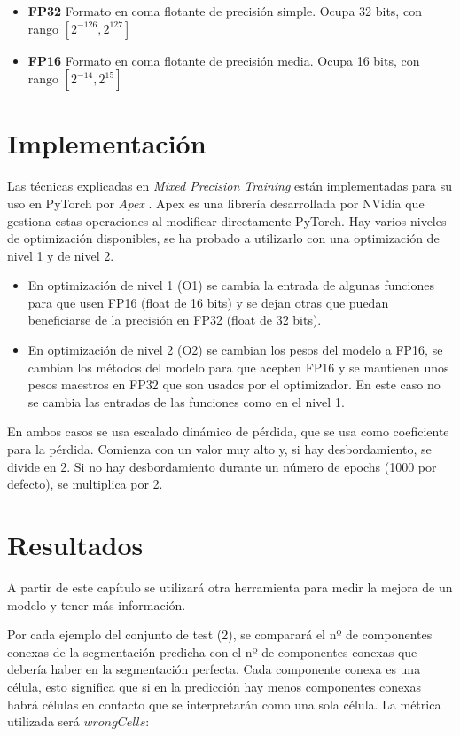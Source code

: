 \begin{itemize}
\item \textbf{FP32} Formato en coma flotante de precisión simple. Ocupa 32 bits, con rango $[2^{-126},2^{127}]$
\item \textbf{FP16} Formato en coma flotante de precisión media. Ocupa 16 bits, con rango $[2^{-14},2^{15}]$
\end{itemize}

\section{Implementación}\label{sec:apex_implementation}

Las técnicas explicadas en \textit{Mixed Precision Training} están implementadas para su uso en PyTorch por \textit{Apex} \cite{Apex2020}. Apex es una librería desarrollada por NVidia que gestiona estas operaciones al modificar directamente PyTorch. Hay varios niveles de optimización disponibles, se ha probado a utilizarlo con una optimización de nivel 1 y de nivel 2.
\begin{itemize}
\item En optimización de nivel 1 (O1) se cambia la entrada de algunas funciones para que usen FP16 (float de 16 bits) y se dejan otras que puedan beneficiarse de la precisión en FP32 (float de 32 bits).
\item En optimización de nivel 2 (O2) se cambian los pesos del modelo a FP16, se cambian los métodos del modelo para que acepten FP16 y se mantienen unos pesos maestros en FP32 que son usados por el optimizador. En este caso no se cambia las entradas de las funciones como en el nivel 1.
\end{itemize}

En ambos casos se usa escalado dinámico de pérdida, que se usa como coeficiente para la pérdida. Comienza con un valor muy alto y, si hay desbordamiento, se divide en 2. Si no hay desbordamiento durante un número de epochs (1000 por defecto), se multiplica por 2.

\section{Resultados}\label{sec:apex_resultados}

A partir de este capítulo se utilizará otra herramienta para medir la mejora de un modelo y tener más información.

Por cada ejemplo del conjunto de test (2), se comparará el nº de componentes conexas de la segmentación predicha con el nº de componentes conexas que debería haber en la segmentación perfecta. Cada componente conexa es una célula, esto significa que si en la predicción hay menos componentes conexas habrá células en contacto que se interpretarán como una sola célula. La métrica utilizada será $wrongCells$:

